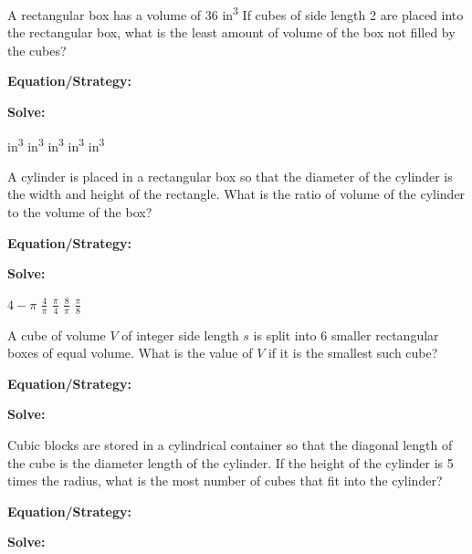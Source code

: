 \vfill
\newpage
\begin{multicols*}{2}
\begin{outline}[enumerate]
\medium

\1 A rectangular box has a volume of 36 in\textsuperscript{3} If cubes of side length 2 are placed into the rectangular box, what is the least amount of volume of the box not filled by the cubes?

\bigskip
\textbf{Equation/Strategy:} \hrulefill

\bigskip
\textbf{Solve:}

\vfill
{} in\textsuperscript{3}
 in\textsuperscript{3}
 in\textsuperscript{3}
 in\textsuperscript{3}
 in\textsuperscript{3}

\midline

\1 A cylinder is placed in a rectangular box so that the diameter of the cylinder is the width and height of the rectangle. What is the ratio of volume of the cylinder to the volume of the box?

\bigskip
\textbf{Equation/Strategy:} \hrulefill

\bigskip
\textbf{Solve:}

\vfill
\2 $4-\pi$
\2 $\frac{4}{\pi}$
\2 $\frac{\pi}{4}$
\2 $\frac{8}{\pi}$
\2 $\frac{\pi}{8}$

\columnbreak
\advanced

\1 A cube of volume $V$ of integer side length $s$ is split into 6 smaller rectangular boxes of equal volume. What is the value of $V$ if it is the smallest such cube?

\bigskip
\textbf{Equation/Strategy:} \hrulefill

\bigskip
\textbf{Solve:}

\vfill
{}

\midline

\1 Cubic blocks are stored in a cylindrical container so that the diagonal length of the cube is the diameter length of the cylinder. If the height of the cylinder is 5 times the radius, what is the most number of cubes that fit into the cylinder?

\bigskip
\textbf{Equation/Strategy:}

\bigskip
\textbf{Solve:}

\vfill
{}
\end{outline}
\end{multicols*}